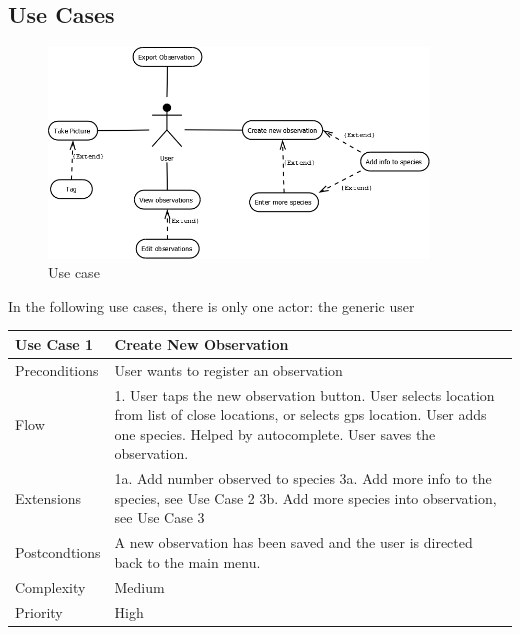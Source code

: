 \subsection{Use Cases}
\begin{figure}[htb]
	\centering
	\includegraphics[width=0.9\textwidth]{reqspec/UseCase.png}
	\caption{Use case}
	\label{fig:usecase}
\end{figure}

In the following use cases, there is only one actor: the generic user

\begin{tabular}[t]{|l|p{}|}\hline
	Use Case 1&Create New Observation\\\hline
	Preconditions&User wants to register an observation\\\hline
	Flow&1. User taps the new observation button\newline
	2. User selects location from list of close locations, or selects gps location\newline
	3. User adds one species. Helped by autocomplete\newline
	4. User saves the observation.\\\hline
	Extensions& 1a. Add number observed to species\newline
	3a. Add more info to the species, see Use Case 2\newline
	3b. Add more species into observation, see Use Case 3\\\hline
	Postcondtions&A new observation has been saved and the user is directed back to the main menu.\\\hline
	Complexity&Medium\\\hline
	Priority&High\\\hline
\end{tabular}

\hspace{2em}


